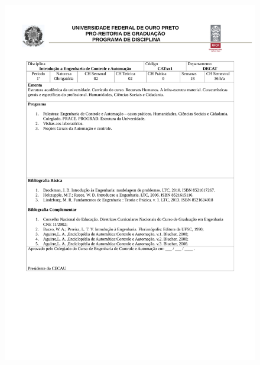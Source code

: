 \begin{figure}[p]
	\centering 
	\includegraphics[scale=0.7]{capitulos/anexo1-programas-disciplina/p13.pdf}
\end{figure}

